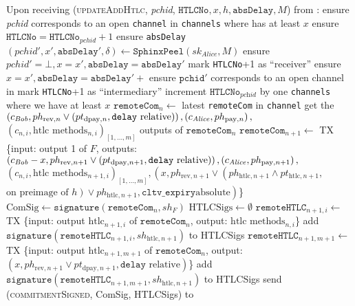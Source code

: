 \begin{algorithmic}[1]
    \State Upon receiving (\textsc{updateAddHtlc}, \textit{pchid},
    $\mathtt{HTLCNo}, x, h, \mathtt{absDelay}, M$) from \bob:
    \Indent
      \State ensure \textit{pchid} corresponds to an open \texttt{channel} in
      \texttt{channels} where \bob{} has at least $x$
      \State ensure $\mathtt{HTLCNo} = \mathtt{HTLCNo}_{\mathit{pchid}} + 1$
      \State ensure \texttt{absDelay} 
      \State $\left(\mathit{pchid}', x', \mathtt{absDelay}', \delta\right) \gets
      \mathtt{SphinxPeel}\left(sk_{\textit{Alice}}, M\right)$
        \State ensure $\mathit{pchid}' = \bot, x = x', \mathtt{absDelay} =
        \mathtt{absDelay}'$
        \State mark \texttt{HTLCNo}+1 as ``receiver''
      \Else {}
        \State ensure $x = x', \mathtt{absDelay} = \mathtt{absDelay}' +$
        \State ensure $\mathtt{pchid}'$ corresponds to an open channel in
        \State mark \texttt{HTLCNo}+1 as ``intermediary''
      \EndIf
      \State increment $\mathtt{HTLCNo}_{\textit{pchid}}$ by one
      \texttt{channels} where we have at least $x$
      \State $\mathtt{remoteCom}_n \gets$ latest \texttt{remoteCom} in
      \texttt{channel}
      \State get the $\left(c_{\mathit{Bob}}, ph_{\mathrm{rev}, n} \vee
      \left(pt_{\mathrm{dpay}, n}, \mathtt{delay} \text{
      relative}\right)\right), \left(c_{\mathit{Alice}}, ph_{\mathrm{pay}, n}\right),$
      $\left(c_{n, i}, \text{htlc methods}_{n, i}\right)_{\left[1, \dots,
      m\right]}$ outputs of $\mathtt{remoteCom}_n$
      \State {}
      \State $\mathtt{remoteCom}_{n+1} \gets$ TX \{input: output 1 of $F$,
      outputs:
      \State $\left(c_{\mathit{Bob}} - x, ph_{\mathrm{rev}, n+1} \vee
      \left(pt_{\mathrm{dpay}, n+1}, \mathtt{delay} \text{
      relative}\right)\right), \left(c_{\mathit{Alice}}, ph_{\mathrm{pay},
      n+1}\right),$ $\left(c_{n, i}, \text{htlc methods}_{n+1,
      i}\right)_{\left[1, \dots, m\right]}, \left(x, ph_{\mathrm{rev}, n+1}
      \vee \left(ph_{\mathrm{htlc}, n+1} \wedge pt_{\mathrm{htlc},
      n+1},\right.\right.$ $\left.\left.\text{on preimage of } h\right) \vee
      ph_{\mathrm{htlc}, n+1}, \mathtt{cltv\_expiry} \text{
      absolute}\right)$\}
      \State $\mathrm{ComSig} \gets
      \mathtt{signature}\left(\mathtt{remoteCom}_n, sh_F\right)$
      \State $\mathrm{HTLCSigs} \gets \emptyset$
        \State $\mathtt{remoteHTLC}_{n+1, i} \gets$ TX \{input:
        output $\mathrm{htlc}_{n+1, i}$ of $\mathtt{remoteCom}_n$, output:
        $\text{htlc methods}_{n, i}$\}
        \State add $\mathtt{signature}\left(\mathtt{remoteHTLC}_{n+1, i},
        sh_{\mathrm{htlc}, n+1}\right)$ to HTLCSigs
      \EndFor
      \State $\mathtt{remoteHTLC}_{n+1, m+1} \gets$ TX \{input: output
      $\mathrm{htlc}_{n+1, m+1}$ of $\mathtt{remoteCom}_n$, output: $\left(x,
      ph_{\mathrm{rev}, n+1} \vee pt_{\mathrm{dpay}, n+1}, \mathtt{delay}
      \text{ relative}\right)$\} 
      \State add $\mathtt{signature}\left(\mathtt{remoteHTLC}_{n+1, m+1},
      sh_{\mathrm{htlc}, n+1}\right)$ to HTLCSigs
      \State send (\textsc{commitmentSigned}, ComSig, HTLCSigs) to \bob
    \EndIndent
    \State


\end{algorithmic}
